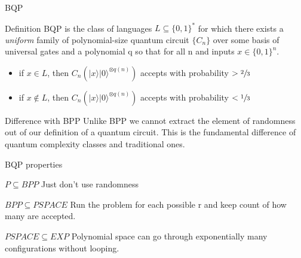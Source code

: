     \begin{frame}{BQP}
        \begin{block}{Definition}
            BQP is the class of languages  $L \subseteq \{0,1\}^*$ for which there exists a \emph{uniform}
            family of polynomial-size quantum circuit $\{C_n\}$ over some basis of universal gates and a polynomial q
            so that for all n and inputs $x \in \{0,1\}^n$.
            \begin{itemize}
                \item if $x \in L$, then $C_n(|x\rangle|0\rangle^{\otimes q(n)})$ accepts with probability $> \sfrac{2}{3}$
                \item if $x \notin L$, then $C_n(|x\rangle|0\rangle^{\otimes q(n)})$ accepts with probability $< \sfrac{1}{3}$
            \end{itemize}
        \end{block}
        \pause
        \begin{alertblock}{Difference with BPP}
            Unlike BPP we cannot extract the element of randomness out of our definition of a quantum circuit.
            This is the fundamental difference of quantum complexity classes and traditional ones. 
        \end{alertblock}
    \end{frame}
    \begin{frame}{BQP properties}
        \begin{block}{$P \subseteq BPP$}
            \pause
            Just don't use randomness
        \end{block}
        \pause
        \begin{block}{$BPP \subseteq PSPACE$}
            \pause
            Run the problem for each possible r and keep count of how many are accepted.
        \end{block}
        \pause
        \begin{block}{$PSPACE \subseteq EXP$}
            \pause
            Polynomial space can go through exponentially many configurations without looping.
        \end{block}
    \end{frame}
